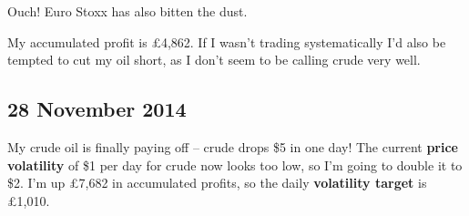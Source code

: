 Ouch! Euro Stoxx has also bitten the dust.


My accumulated profit is £4,862. If I wasn't trading systematically I'd also be tempted to cut my oil short, as I don't seem to be calling crude very well.

\subsection*{28 November 2014}

My crude oil is finally paying off -- crude drops \$5 in one day! The current \textbf{price volatility} of \$1 per day for crude now looks too low, so I'm going to double it to \$2. I'm up £7,682 in accumulated profits, so the daily \textbf{volatility target} is £1,010.

